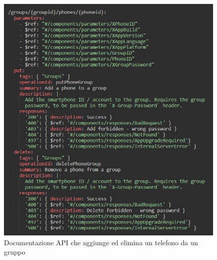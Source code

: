 \documentclass[main.tex]{subfiles}
\begin{document}
\begin{figure}[H]
    \centering
    \includegraphics[width=1\linewidth]{img/redesign-api-task/redesign-api-swagger-phone-old.PNG}
    \caption{Documentazione API che aggiunge ed elimina un telefono da un gruppo}
    \label{fig:redesign-api-swagger-phone-old}
\end{figure}
\end{document}
